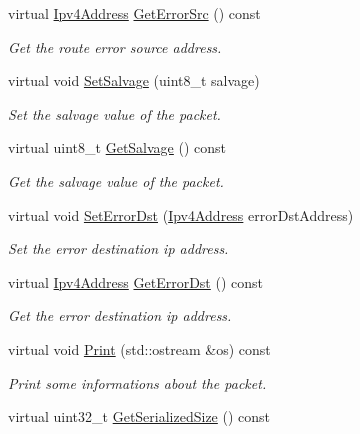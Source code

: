 \begin{DoxyCompactItemize}
virtual \hyperlink{classns3_1_1Ipv4Address}{Ipv4\+Address} \hyperlink{classns3_1_1dsr_1_1DsrOptionRerrHeader_ad55e012ca8e5b18cdc2fec56f2771153}{Get\+Error\+Src} () const 
\begin{DoxyCompactList}\small\item\em Get the route error source address. \end{DoxyCompactList}\item 
virtual void \hyperlink{classns3_1_1dsr_1_1DsrOptionRerrHeader_a18b0740d33b9f1d7f5c92fbbf5df2103}{Set\+Salvage} (uint8\+\_\+t salvage)
\begin{DoxyCompactList}\small\item\em Set the salvage value of the packet. \end{DoxyCompactList}\item 
virtual uint8\+\_\+t \hyperlink{classns3_1_1dsr_1_1DsrOptionRerrHeader_a83c8be7b08324714f0d334e119bbd996}{Get\+Salvage} () const 
\begin{DoxyCompactList}\small\item\em Get the salvage value of the packet. \end{DoxyCompactList}\item 
virtual void \hyperlink{classns3_1_1dsr_1_1DsrOptionRerrHeader_aa9a354fa8efaa9bded6462dc0d97b2fa}{Set\+Error\+Dst} (\hyperlink{classns3_1_1Ipv4Address}{Ipv4\+Address} error\+Dst\+Address)
\begin{DoxyCompactList}\small\item\em Set the error destination ip address. \end{DoxyCompactList}\item 
virtual \hyperlink{classns3_1_1Ipv4Address}{Ipv4\+Address} \hyperlink{classns3_1_1dsr_1_1DsrOptionRerrHeader_a438d7f37b24e7b1685021598726bc9cd}{Get\+Error\+Dst} () const 
\begin{DoxyCompactList}\small\item\em Get the error destination ip address. \end{DoxyCompactList}\item 
virtual void \hyperlink{classns3_1_1dsr_1_1DsrOptionRerrHeader_af52a2710cba2a9a0e4469605885143b0}{Print} (std\+::ostream \&os) const 
\begin{DoxyCompactList}\small\item\em Print some informations about the packet. \end{DoxyCompactList}\item 
virtual uint32\+\_\+t \hyperlink{classns3_1_1dsr_1_1DsrOptionRerrHeader_a4180ff652cca33187a72db332dfdc687}{Get\+Serialized\+Size} () const 

\end{DoxyCompactItemize}
